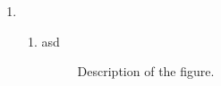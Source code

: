 \documentclass[11pt]{article}
\begin{document}

\pagestyle{fancy}
\fancyhf{}
\cfoot{\thepage}

\begin{enumerate}[label=\textbf{\arabic*}.]
    \item %
    \begin{enumerate}
        \item %
            asd
        
        \begin{figure}[h!] %
            \centering
            \resizebox{1\textwidth}{!}{} %
            \caption{Description of the figure.}
            \label{fig:my_label}
        \end{figure}
            
    \end{enumerate}
\end{enumerate}
\end{document}
